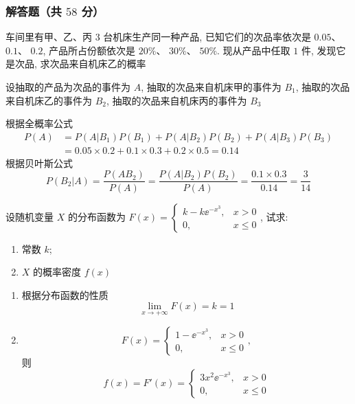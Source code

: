 \subsubsection{解答题（共 $58$ 分）}
\begin{ti}[$10$ 分]
	车间里有甲、乙、丙 $3$ 台机床生产同一种产品, 已知它们的次品率依次是 $0.05$、 $0.1$、 $0.2$, 产品所占份额依次是 $20\%$、 $30\%$、 $50\%$. 现从产品中任取 $1$ 件, 发现它是次品, 求次品来自机床乙的概率
	\begin{solution}
		设抽取的产品为次品的事件为 $A$, 抽取的次品来自机床甲的事件为 $B_1$, 抽取的次品来自机床乙的事件为 $B_2$, 抽取的次品来自机床丙的事件为 $B_3$
		
		根据全概率公式
		\begin{equation*}
			\begin{aligned}
			P(A)&=P(A|B_1)P(B_1)+P(A|B_2)P(B_2)+P(A|B_3)P(B_3)\\
			&=0.05\times0.2+0.1\times0.3+0.2\times0.5=0.14
			\end{aligned}
		\end{equation*}
		根据贝叶斯公式
		\begin{equation*}
			P(B_2|A)=\frac{P(AB_2)}{P(A)}=\frac{P(A|B_2)P(B_2)}{P(A)}=\frac{0.1\times0.3}{0.14}=\frac{3}{14}
		\end{equation*}
	\end{solution}
\end{ti}

\begin{ti}[$10$ 分]
	设随机变量 $X$ 的分布函数为 $F(x)=
	\begin{cases}
	k-k\ee^{-x^3}, & x>0\\
	0, & x\leq0
	\end{cases}
	$, 试求:
	\begin{enumerate}
		\item 常数 $k$;
		\item $X$ 的概率密度 $f(x)$
	\end{enumerate}
	\begin{solution}
		\begin{enumerate}
		  \item 根据分布函数的性质
		  \[
			  \lim_{x\to+\infty}F(x)=k=1
		  \]
		  \item 
		  \[
			  F(x)=
		  	\begin{cases}
		  	1-\ee^{-x^3}, & x>0\\
		  	0, & x\leq0 
		  	\end{cases},
		  \]
		  则
		  \[
			  f(x)=F'(x)=
		  	\begin{cases}
		  	3x^2\ee^{-x^3}, & x>0\\
		  	0, & x\leq0
		  \end{cases}
		  \]
		\end{enumerate}
	  \end{solution}
\end{ti}

